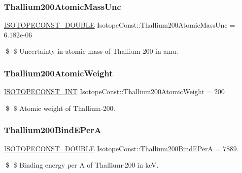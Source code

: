 \subsubsection{\texorpdfstring{Thallium200\+Atomic\+Mass\+Unc}{Thallium200AtomicMassUnc}}
{\footnotesize\ttfamily \mbox{\hyperlink{group___isotope_const-_macros_ga8f45a7272ce02c0b4c65c44636ed719a}{I\+S\+O\+T\+O\+P\+E\+C\+O\+N\+S\+T\+\_\+\+D\+O\+U\+B\+LE}} Isotope\+Const\+::\+Thallium200\+Atomic\+Mass\+Unc = 6.\+182e-\/06}

\$ \$ Uncertainty in atomic mass of Thallium-\/200 in amu. \mbox{\label{group___isotope_const-_thallium-_tl200_gaef2016277a224e4cf8cfaa37c015f988}} 
\subsubsection{\texorpdfstring{Thallium200\+Atomic\+Weight}{Thallium200AtomicWeight}}
{\footnotesize\ttfamily \mbox{\hyperlink{group___isotope_const-_macros_ga5f18360b3e99483a35c32d789e62621c}{I\+S\+O\+T\+O\+P\+E\+C\+O\+N\+S\+T\+\_\+\+I\+NT}} Isotope\+Const\+::\+Thallium200\+Atomic\+Weight = 200}

\$ \$ Atomic weight of Thallium-\/200. \mbox{\label{group___isotope_const-_thallium-_tl200_ga85a769c1c844faf10017a559c31a6047}} 
\subsubsection{\texorpdfstring{Thallium200\+Bind\+E\+PerA}{Thallium200BindEPerA}}
{\footnotesize\ttfamily \mbox{\hyperlink{group___isotope_const-_macros_ga8f45a7272ce02c0b4c65c44636ed719a}{I\+S\+O\+T\+O\+P\+E\+C\+O\+N\+S\+T\+\_\+\+D\+O\+U\+B\+LE}} Isotope\+Const\+::\+Thallium200\+Bind\+E\+PerA = 7889.}

\$ \$ Binding energy per A of Thallium-\/200 in keV. \mbox{\label{group___isotope_const-_thallium-_tl200_gaa230e30e0db97584bb91baa51ecf6114}} 
